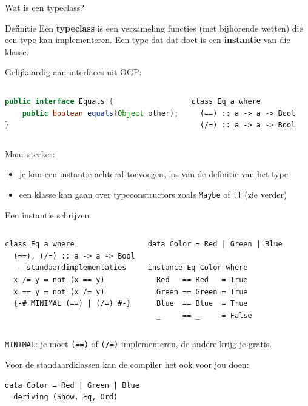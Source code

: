 \documentclass[aspectratio=169,11pt]{beamer}
\newcommand{\hs}{\lstinline[style=hsinline]}
\begin{document}
\begin{frame}[fragile]{Wat is een typeclass?}
  \begin{block}{Definitie}
    Een \textbf{typeclass} is een verzameling functies (met bijhorende
    \alert{wetten}) die een type kan implementeren.
    Een type dat dat doet is een \textbf{instantie} van die klasse.
  \end{block}
  \pause
  Gelijkaardig aan interfaces uit OGP:
  \begin{columns}[T]
\begin{lstlisting}[language=Java,keywords={public,interface,boolean},keywords={[2]Object},keywords={[3]equals}]
public interface Equals {
    public boolean equals(Object other);
}
\end{lstlisting}
\begin{lstlisting}
class Eq a where
  (==) :: a -> a -> Bool
  (/=) :: a -> a -> Bool
\end{lstlisting}
  \end{columns}
  \pause
  \vspace{4pt}
  Maar sterker:
  \begin{itemize}
    \item je kan een instantie \alert{achteraf} toevoegen, los van de definitie van het type
    \item een klasse kan gaan over \alert{typeconstructors} zoals \hs{Maybe} of \hs{[]} (zie verder)
  \end{itemize}
\end{frame}

\begin{frame}[fragile]{Een instantie schrijven}
  \begin{columns}[T]
\begin{lstlisting}
class Eq a where
  (==), (/=) :: a -> a -> Bool
  -- standaardimplementaties
  x /= y = not (x == y)
  x == y = not (x /= y)
  {-# MINIMAL (==) | (/=) #-}
\end{lstlisting}
\begin{lstlisting}
data Color = Red | Green | Blue
 
instance Eq Color where
  Red   == Red   = True
  Green == Green = True
  Blue  == Blue  = True
  _     == _     = False
\end{lstlisting}
  \end{columns}
  \pause
  \vspace{6pt}
  \hs{MINIMAL}: je moet \hs{(==)} \alert{of} \hs{(/=)} implementeren, de andere krijg je gratis.
  \pause
 
  \vspace{6pt}
  Voor de standaardklassen kan de compiler het ook voor jou doen:
\begin{lstlisting}
data Color = Red | Green | Blue
  deriving (Show, Eq, Ord)
\end{lstlisting}
\end{frame}
\end{document}
